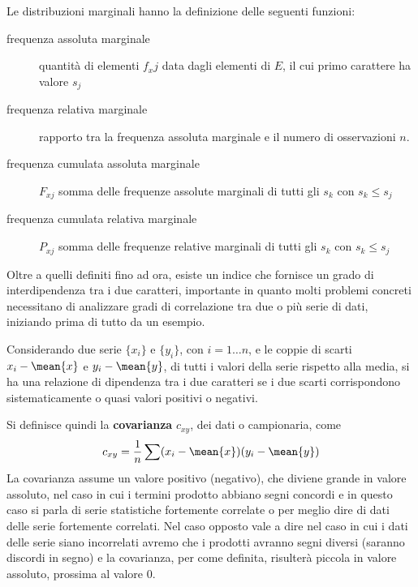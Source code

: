 \documentclass[a4paper,12pt, oneside]{book}
\begin{document}
Le distribuzioni marginali hanno la definizione delle seguenti funzioni:
\begin{description}
    \item [frequenza assoluta marginale] quantità di elementi $f_xj$ data dagli elementi di $E$, 
                                         il cui primo carattere ha valore $s_j$
    \item [frequenza relativa marginale] rapporto tra la frequenza assoluta marginale e il numero di osservazioni $n$.
    \item [frequenza cumulata assoluta marginale] $F_{xj}$ somma delle frequenze assolute marginali 
                                                  di tutti gli $s_k$ con $s_k \leq s_j$
    \item [frequenza cumulata relativa marginale] $P_{xj}$ somma delle frequenze relative marginali
                                                  di tutti gli $s_k$ con $s_k \leq s_j$
\end{description}
Oltre a quelli definiti fino ad ora, esiste un indice che fornisce un grado di interdipendenza tra i due caratteri,
importante in quanto molti problemi concreti necessitano di analizzare gradi di correlazione tra due o più serie di dati,
iniziando prima di tutto da un esempio.

Considerando due serie $\{x_i\}$ e $\{y_i\}$, con $i = 1 \dots n$, e le coppie di scarti $x_i - \mean{x}$ 
e $y_i - \mean{y}$, di tutti i valori della serie rispetto alla media, si ha una relazione di dipendenza
tra i due caratteri se i due scarti corrispondono sistematicamente o quasi valori positivi o negativi.

Si definisce quindi la \textbf{covarianza} $c_{xy}$, dei dati o campionaria, come 
\[ c_{xy} = \frac{1}{n} \sum (x_i - \mean{x}) (y_i - \mean{y}) \]
La covarianza assume un valore positivo (negativo), che diviene grande in valore assoluto, nel caso in cui 
i termini prodotto abbiano segni concordi e in questo caso si parla di serie statistiche fortemente correlate
o per meglio dire di dati delle serie fortemente correlati.\newline
Nel caso opposto vale a dire nel caso in cui i dati delle serie siano incorrelati avremo che i prodotti
avranno segni diversi (saranno discordi in segno) e la covarianza, per come definita,
risulterà piccola in valore assoluto, prossima al valore 0.
\end{document}

